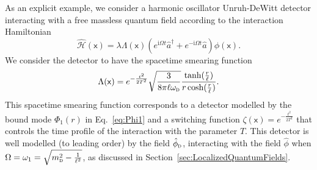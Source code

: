 \documentclass[letterpaper,12pt,titlepage,oneside,final]{book}
\newcommand{\mf}{\mathsf}%
\newcommand{\ii}{\mathrm{i}}
\newcommand{\tc}[1]{\textsc{#1}}
\begin{document}
As an explicit example, we consider a harmonic oscillator Unruh-DeWitt detector interacting with a free massless quantum field according to the interaction Hamiltonian
\begin{equation}
    \hat{\mathcal{H}}(\mf x) = \lambda \Lambda(\mf x)(e^{\ii \Omega t} \hat{a}^\dagger + e^{- \ii \Omega t}\hat{a})\hat{\phi}(\mf x).
\end{equation}
We consider the detector to have the spacetime smearing function
\begin{equation}
    \Lambda(\mf x) = e^{-\frac{t^2}{2T^2}} \sqrt{\frac{3}{8\pi \ell\omega_{\tc{d}}}}\frac{\tanh(\tfrac{r}{\ell})}{r \cosh(\tfrac{r}{\ell})}.
\end{equation}
This spacetime smearing function corresponds to a detector modelled by the bound mode $\Phi_1(r)$ in Eq.~\eqref{eq:Phi1} and a switching function $\zeta(\mf x) = e^{-\frac{t^2}{2 T^2}}$ that controls the time profile of the interaction with the parameter $T$. This detector is well modelled (to leading order) by the field $\hat{\phi}_\tc{d}$, interacting with the field $\hat{\phi}$ when $\Omega = \omega_1 = \sqrt{m_\tc{d}^2 - \tfrac{1}{\ell^2}}$, as discussed in Section~\ref{sec:LocalizedQuantumFields}.
\end{document}
